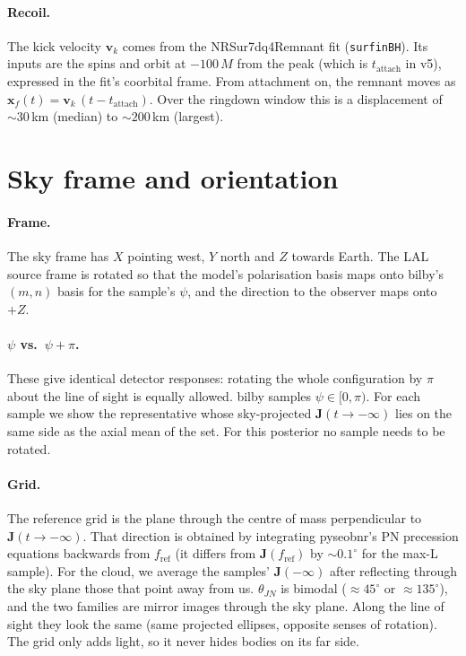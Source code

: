 \documentclass[11pt,a4paper]{article}
\newcommand{\code}[1]{\texttt{#1}}
\newcommand{\vect}[1]{\boldsymbol{#1}}
\begin{document}
\paragraph{Recoil.} The kick velocity $\vect{v}_k$ comes from the NRSur7dq4Remnant fit
(\code{surfinBH}). Its inputs are the spins and orbit at $-100\,M$ from the peak (which is
$t_\mathrm{attach}$ in v5), expressed in the fit's coorbital frame. From attachment on, the
remnant moves as $\vect{x}_f(t) = \vect{v}_k\,(t - t_\mathrm{attach})$. Over the
ringdown window this is a displacement of $\sim\!30$\,km (median) to $\sim\!200$\,km (largest).

\section{Sky frame and orientation}\label{sec:sky}

\paragraph{Frame.} The sky frame has $X$ pointing west, $Y$ north and $Z$ towards Earth. The LAL
source frame is rotated so that the model's polarisation basis maps onto bilby's $(m,n)$
basis for the sample's $\psi$, and the direction to the observer maps onto $+Z$.

\paragraph{$\psi$ vs.\ $\psi+\pi$.} These give identical detector responses: rotating
the whole configuration by $\pi$ about the line of sight is equally allowed. bilby samples
$\psi\in[0,\pi)$. For each sample we show the representative whose sky-projected
$\vect{J}(t\to-\infty)$ lies on the same side as the axial mean of the set. For this posterior
no sample needs to be rotated.

\paragraph{Grid.} The reference grid is the plane through the centre of mass perpendicular
to $\vect{J}(t\to-\infty)$. That direction is obtained by integrating pyseobnr's PN
precession equations backwards from $f_\mathrm{ref}$ (it differs from $\vect{J}(f_\mathrm{ref})$
by $\sim0.1^\circ$ for the max-L sample). For the cloud, we average the samples'
$\vect{J}(-\infty)$ after reflecting through the sky plane those that point away from
us. $\theta_{JN}$ is bimodal ($\approx45^\circ$ or $\approx135^\circ$), and the two families
are mirror images through the sky plane. Along the line of sight they look the same
(same projected ellipses, opposite senses of rotation). The grid only adds light, so it
never hides bodies on its far side.
\end{document}
